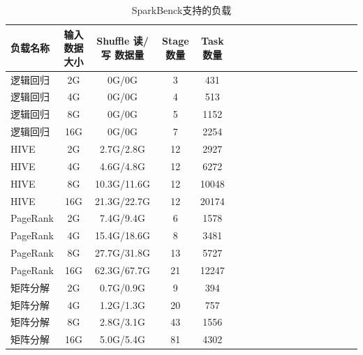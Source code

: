 \begin{table}
 \centering
 \caption{SparkBenck支持的负载}
 \label{tab:workload}
 \begin{tabular}{lccccccccccccccccl}
  \toprule
  负载名称 & 输入数据大小 & Shuffle 读/写 数据量 & Stage 数量 & Task 数量 \\
  \midrule
  逻辑回归 & 2G & 0G/0G & 3 & 431 \\  
  逻辑回归 & 4G & 0G/0G & 4 & 513 \\  
  逻辑回归 & 8G & 0G/0G & 5 & 1152 \\  
  逻辑回归 & 16G & 0G/0G & 7 & 2254 \\  
  HIVE & 2G & 2.7G/2.8G & 12 & 2927 \\  
  HIVE & 4G & 4.6G/4.8G & 12 & 6272 \\  
  HIVE & 8G & 10.3G/11.6G & 12 & 10048 \\  
  HIVE & 16G & 21.3G/22.7G & 12 & 20174 \\ 
  PageRank & 2G & 7.4G/9.4G & 6 & 1578 \\  
  PageRank & 4G & 15.4G/18.6G & 8 & 3481 \\  
  PageRank & 8G & 27.7G/31.8G & 13 & 5727 \\  
  PageRank & 16G & 62.3G/67.7G & 21 & 12247 \\
  矩阵分解 & 2G & 0.7G/0.9G & 9 & 394 \\  
  矩阵分解 & 4G & 1.2G/1.3G & 20 & 757 \\  
  矩阵分解 & 8G & 2.8G/3.1G & 43 & 1556 \\  
  矩阵分解 & 16G & 5.0G/5.4G & 81 & 4302\\  
  \bottomrule
 \end{tabular}
\end{table}

